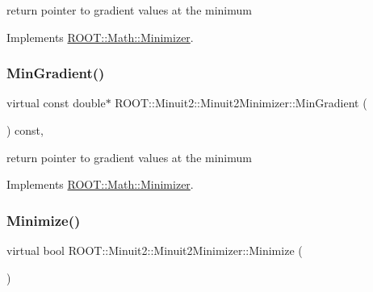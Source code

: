 return pointer to gradient values at the minimum 



Implements \mbox{\hyperlink{classROOT_1_1Math_1_1Minimizer_a861036d38a21d9a60d44e068397307af}{R\+O\+O\+T\+::\+Math\+::\+Minimizer}}.

\mbox{\label{classROOT_1_1Minuit2_1_1Minuit2Minimizer_a52c6b3a13108b64366b1acd43f7e2b9a}} 
\subsubsection{\texorpdfstring{MinGradient()}{MinGradient()}\hspace{0.1cm}{\footnotesize\ttfamily [2/2]}}
{\footnotesize\ttfamily virtual const double$\ast$ R\+O\+O\+T\+::\+Minuit2\+::\+Minuit2\+Minimizer\+::\+Min\+Gradient (\begin{DoxyParamCaption}{ }\end{DoxyParamCaption}) const\hspace{0.3cm}{\ttfamily [inline]}, {\ttfamily [virtual]}}



return pointer to gradient values at the minimum 



Implements \mbox{\hyperlink{classROOT_1_1Math_1_1Minimizer_a861036d38a21d9a60d44e068397307af}{R\+O\+O\+T\+::\+Math\+::\+Minimizer}}.

\mbox{\label{classROOT_1_1Minuit2_1_1Minuit2Minimizer_af5d2da195d2b1a7eac6d9b8859eec2b9}} 
\subsubsection{\texorpdfstring{Minimize()}{Minimize()}\hspace{0.1cm}{\footnotesize\ttfamily [1/2]}}
{\footnotesize\ttfamily virtual bool R\+O\+O\+T\+::\+Minuit2\+::\+Minuit2\+Minimizer\+::\+Minimize (\begin{DoxyParamCaption}{ }\end{DoxyParamCaption})\hspace{0.3cm}{\ttfamily [virtual]}}

